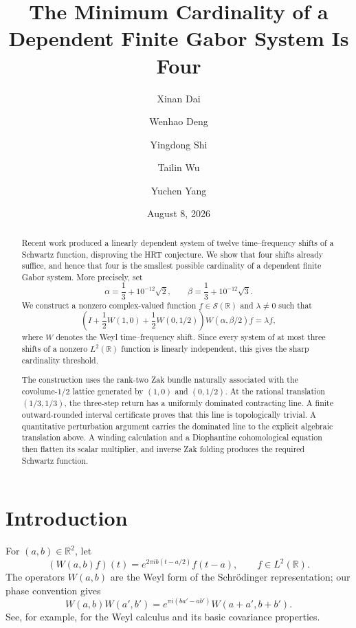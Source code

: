 \documentclass[11pt]{amsart}
\title{The Minimum Cardinality of a Dependent Finite Gabor System Is Four}
\author{Xinan Dai}
\author{Wenhao Deng}
\author{Yingdong Shi}
\author{Tailin Wu}
\author{Yuchen Yang}
\date{August 8, 2026}
\theoremstyle{remark}
\newcommand{\R}{\mathbb R}
\newcommand{\cS}{\mathcal S}
\begin{document}
\begin{abstract}
Recent work produced a linearly dependent system of twelve time--frequency
shifts of a Schwartz function, disproving the HRT conjecture.  We show that
four shifts already suffice, and hence that four is the smallest possible
cardinality of a dependent finite Gabor system.  More precisely, set
\[
 \alpha=\frac13+10^{-12}\sqrt2,\qquad
 \beta =\frac13+10^{-12}\sqrt3.
\]
We construct a nonzero complex-valued function $f\in\cS(\R)$ and
$\lambda\ne0$ such that
\[
 \left(I+\frac12W(1,0)+\frac12W(0,1/2)\right)
 W(\alpha,\beta/2)f=\lambda f,
\]
where $W$ denotes the Weyl time--frequency shift.  Since every system of at
most three shifts of a nonzero $L^2(\R)$ function is linearly independent,
this gives the sharp cardinality threshold.

The construction uses the rank-two Zak bundle naturally associated with the
covolume-$1/2$ lattice generated by $(1,0)$ and $(0,1/2)$.  At the rational
translation $(1/3,1/3)$, the three-step return has a uniformly dominated
contracting line.  A finite outward-rounded interval certificate proves that
this line is topologically trivial.  A quantitative perturbation argument
carries the dominated line to the explicit algebraic translation above.  A
winding calculation and a Diophantine cohomological equation then flatten its
scalar multiplier, and inverse Zak folding produces the required Schwartz
function.
\end{abstract}

\maketitle

\section{Introduction}\label{sec:intro}

For $(a,b)\in\R^2$, let
\begin{equation}\label{eq:Weyl-def}
 (W(a,b)f)(t)=e^{2\pi i b(t-a/2)}f(t-a),\qquad f\in L^2(\R).
\end{equation}
The operators $W(a,b)$ are the Weyl form of the Schr\"odinger representation;
our phase convention gives
\begin{equation}\label{eq:weyl-law}
 W(a,b)W(a',b')
 =e^{\pi i(ba'-ab')}W(a+a',b+b').
\end{equation}
See, for example, \cite[Chapter~1]{Folland89} for the Weyl calculus and its
basic covariance properties.
\end{document}
